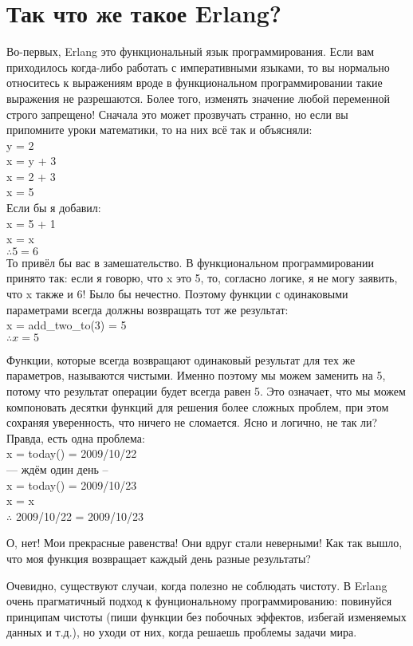 \section{Так что же такое Erlang?}
Во\--первых, Erlang это функциональный язык программирования.
Если вам приходилось когда\--либо работать с императивными языками, то вы нормально относитесь к выражениям вроде  в функциональном программировании такие выражения не разрешаются.
Более того, изменять значение любой переменной строго запрещено!
Сначала это может прозвучать странно, но если вы припомните уроки математики, то на них всё так и объясняли:\\ 
y = 2\\ 
x = y + 3\\ 
x = 2 + 3\\ 
x = 5\\ 
Если бы я добавил:\\ 
x = 5 + 1\\ 
x = x\\ 
$\therefore 5 = 6$\\ 

То привёл бы вас в замешательство.
В функциональном программировании принято так: если я говорю, что x это 5, то, согласно логике, я не могу заявить, что x также и 6!
Было бы нечестно.
Поэтому функции с одинаковыми параметрами всегда должны возвращать тот же результат:\\  
x = add\_two\_to(3) = 5\\ 
$\therefore x = 5$
 
Функции, которые  всегда возвращают одинаковый результат для тех же параметров, называются чистыми.
Именно поэтому мы можем заменить   на 5, потому что результат операции  будет всегда равен 5.
Это означает, что мы можем компоновать десятки функций для решения более сложных проблем, при этом сохраняя уверенность, что ничего не сломается.
Ясно и логично, не так ли?
Правда, есть одна проблема:\\ 
x = today() = 2009/10/22\\ 
--- ждём один день --\\ 
x = today() = 2009/10/23\\ 
x = x\\ 
$\therefore$ 2009/10/22 = 2009/10/23 

О, нет!
Мои прекрасные равенства!
Они вдруг стали неверными!
Как так вышло, что моя функция возвращает каждый день разные результаты?

Очевидно, существуют случаи, когда полезно не соблюдать чистоту.
В Erlang очень прагматичный подход к фунциональному программированию: повинуйся принципам чистоты (пиши функции без побочных эффектов, избегай изменяемых данных и т.д.), но уходи от них, когда решаешь проблемы задачи  мира.

